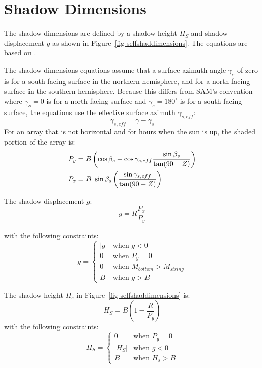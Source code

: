 \documentclass[12pt,letterpaper]{article}
\begin{document}
\section{Shadow Dimensions}\label{sec-selfshaddim}

The shadow dimensions are defined by a shadow height  $H_S$ and shadow displacement $g$ as shown in Figure~\ref{fig-selfshaddimensions}. The equations are based on \citet{appelbaum1979}.

The shadow dimensions equations assume that a surface azimuth angle $\gamma_s$ of zero is for a south-facing surface in the northern hemisphere, and for a north-facing surface in the southern hemisphere. Because this differs from SAM's convention where $\gamma_s=0$ is for a north-facing surface and $\gamma_s=180^\circ$ is for a south-facing surface, the equations use the effective surface azimuth $\gamma_{s,eff}$:
\begin{equation}
\gamma_{s,eff} = \gamma - \gamma_s
\end{equation}
For an array that is not horizontal and for hours when the sun is up, the shaded portion of the array is:
\begin{align} \label{eqn-pxpy}
P_y &= B \left(\cos\beta_s + \cos \gamma_{s,eff} \frac{\sin\beta_s}{\tan(90-Z)}\right)\notag\\
P_x &= B~\sin\beta_s \left(\frac{\sin\gamma_{s,eff}}{\tan(90-Z)}\right)
\end{align}

The shadow displacement $g$:
\begin{equation}\label{eqn-shadowdisplacement}
g=R\frac{P_x}{P_y}
\end{equation}

with the following constraints:
\[
g=
  \left\{
    \begin{array}{ll}
      \lvert g\rvert &  \mbox{when $g<0$}\\
      0 & \mbox{when $P_y=0$}\\
      0 & \mbox{when $M_{bottom}>M_{string}$}\\
      B & \mbox{when $g>B$}
    \end{array}
  \right.
\]

The shadow height $H_s$ in Figure~\ref{fig-selfshaddimensions} is:
\begin{equation} \label{eqn-shadowheight}
H_S=B \left(1-\frac{R}{P_y}\right)
\end{equation}
with the following constraints: 
\[
H_S=
  \left\{
    \begin{array}{ll}
      0                      & \mbox{when $P_y=0$}\\
      \lvert H_S \rvert & \mbox{when $g<0$}\\
      B                     & \mbox{when $H_s>B$}
    \end{array}
  \right.
\]
\end{document}
